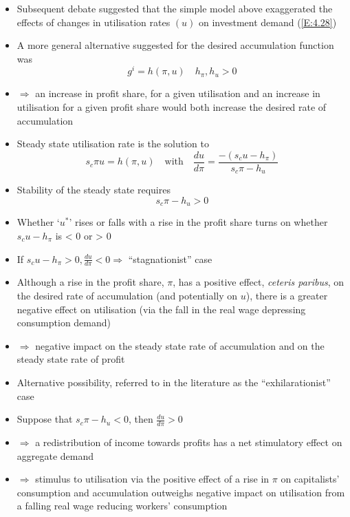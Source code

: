 \documentclass{article}
\begin{document}
\begin{itemize}
		\item Subsequent debate suggested that the simple model above exaggerated the effects of changes in utilisation rates \( (u) \) on investment demand (\cref{E:4.28}) 
		\item A more general alternative suggested for the desired accumulation function was
		\begin{equation}
			g^i = h(\pi,u) \quad h_{\pi},h_u>0 \label{E:4.32}
		\end{equation}
		\item \( \Rightarrow \) an increase in profit share, for a given utilisation and an increase in utilisation for a given profit share would both increase the desired rate of accumulation
		\item  Steady state utilisation rate is the solution to
		\begin{equation}
			s_c\pi u = h(\pi,u) \quad\text{with}\quad \frac{du}{d\pi} = \frac{-\left( s_cu-h_{\pi} \right)}{s_c\pi-h_u} \label{E:4.33}
		\end{equation}
		\item Stability of the steady state requires
		\[
			s_c\pi-h_u>0
		\]
		\item Whether `\( u^* \)' rises or falls with a rise in the profit share turns on whether \( s_c u-h_{\pi} \) is < 0 or > 0
		\item If \( s_c u-h_{\pi} > 0, \frac{du}{d\pi}<0 \Rightarrow \) ``stagnationist'' case
		\item Although a rise in the profit share, \( \pi \), has a positive effect, \textit{ceteris paribus}, on the desired rate of accumulation (and potentially on \( u \)), there is a greater negative effect on utilisation (via the fall in the real wage depressing consumption demand)
		\item \( \Rightarrow \) negative impact on the steady state rate of accumulation and on the steady state rate of profit
		\item Alternative possibility, referred to in the literature as the ``exhilarationist'' case
		\item Suppose that \( s_c\pi-h_u<0 \), then \( \frac{du}{d\pi}>0 \)
		\item \( \Rightarrow \) a redistribution of income towards profits has a net stimulatory effect on aggregate demand
		\item \( \Rightarrow \) stimulus to utilisation via the positive effect of a rise in \( \pi \) on capitalists' consumption and accumulation outweighs negative impact on utilisation from a falling real wage reducing workers' consumption

\end{itemize}
\end{document}
